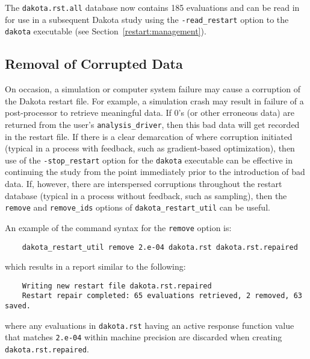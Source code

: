 The \texttt{dakota.rst.all} database now contains 185 evaluations and
can be read in for use in a subsequent Dakota study using the
\texttt{-read\_restart} option to the \texttt{dakota} executable (see
Section~\ref{restart:management}).

\subsection{Removal of Corrupted Data}\label{restart:utility:removal}

On occasion, a simulation or computer system failure may cause a
corruption of the Dakota restart file. For example, a simulation crash
may result in failure of a post-processor to retrieve meaningful data.
If 0's (or other erroneous data) are returned from the user's
\texttt{analysis\_driver}, then this bad data will get recorded in the
restart file. If there is a clear demarcation of where corruption
initiated (typical in a process with feedback, such as gradient-based
optimization), then use of the \texttt{-stop\_restart} option for the
\texttt{dakota} executable can be effective in continuing the study
from the point immediately prior to the introduction of bad data. If,
however, there are interspersed corruptions throughout the restart
database (typical in a process without feedback, such as sampling),
then the \texttt{remove} and \texttt{remove\_ids} options of
\texttt{dakota\_restart\_util} can be useful.

An example of the command syntax for the \texttt{remove} option is:
\begin{small}
\begin{verbatim}
    dakota_restart_util remove 2.e-04 dakota.rst dakota.rst.repaired
\end{verbatim}
\end{small}
which results in a report similar to the following:
\begin{small}
\begin{verbatim}
    Writing new restart file dakota.rst.repaired
    Restart repair completed: 65 evaluations retrieved, 2 removed, 63 saved.
\end{verbatim}
\end{small}
where any evaluations in \texttt{dakota.rst} having an active response
function value that matches \texttt{2.e-04} within machine precision
are discarded when creating \texttt{dakota.rst.repaired}.

